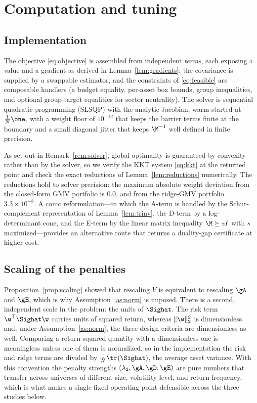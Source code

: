 \section{Computation and tuning}
\label{sec:computation}

\subsection{Implementation}
The objective \eqref{eq:objective} is assembled from independent \emph{terms},
each exposing a value and a gradient as derived in Lemma~\ref{lem:gradients}; the
covariance is supplied by a swappable estimator, and the constraints of
\eqref{eq:feasible} are composable handlers (a budget equality, per-asset box
bounds, group inequalities, and optional group-target equalities for sector
neutrality). The solver is sequential quadratic programming (SLSQP) with the
analytic Jacobian, warm-started at $\tfrac1N\one$, with a weight floor of
$10^{-12}$ that keeps the barrier terms finite at the boundary and a small
diagonal jitter that keeps $\M^{-1}$ well defined in finite precision.

As set out in Remark~\ref{rem:solver}, global optimality is guaranteed by
convexity rather than by the solver, so we verify the KKT system \eqref{eq:kkt}
at the returned point and check the exact reductions of
Lemma~\ref{lem:reductions} numerically. The reductions hold to solver precision:
the maximum absolute weight deviation from the closed-form GMV portfolio is
$0.0$, and from the ridge-GMV portfolio $3.3\times10^{-8}$. A conic
reformulation---in which the A-term is handled by the Schur-complement
representation of Lemma~\ref{lem:trinv}, the D-term by a log-determinant cone,
and the E-term by the linear matrix inequality $\M\succeq s I$ with $s$
maximized---provides an alternative route that returns a duality-gap certificate
at higher cost.

\subsection{Scaling of the penalties}
\label{sec:penaltyscaling}
Proposition~\ref{prop:scaling} showed that rescaling $V$ is equivalent to
rescaling $\gA$ and $\gE$, which is why Assumption~\ref{as:norm} is imposed.
There is a second, independent scale in the problem: the units of $\Sighat$. The
risk term $\w^\top\Sighat\w$ carries units of squared return, whereas
$\lVert\w\rVert_2^2$ is dimensionless and, under Assumption~\ref{as:norm}, the
three design criteria are dimensionless as well. Comparing a return-squared
quantity with a dimensionless one is meaningless unless one of them is
normalized, so in the implementation the risk and ridge terms are divided by
$\tfrac1N\tr(\Sighat)$, the average asset variance. With this convention the
penalty strengths $(\lambda_2,\gA,\gD,\gE)$ are pure numbers that transfer
across universes of different size, volatility level, and return frequency,
which is what makes a single fixed operating point defensible across the three
studies below.

